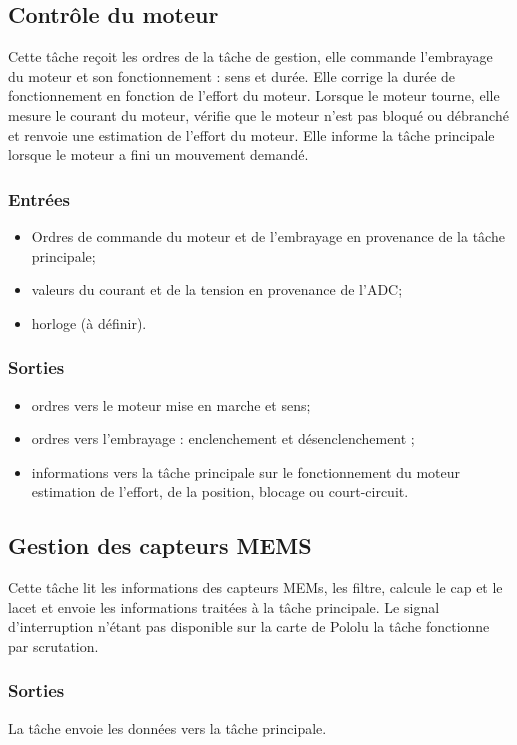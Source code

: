 \documentclass[a4paper,11pt]{report}
\begin{document}
\subsection{Contrôle du moteur}
Cette tâche reçoit les ordres de la tâche de gestion,
elle commande l'embrayage du moteur et son fonctionnement : sens et durée.
Elle corrige la durée de fonctionnement en fonction de l'effort du moteur.
Lorsque le moteur tourne, elle mesure le courant du moteur,
vérifie que le moteur n'est pas bloqué ou débranché et
renvoie une estimation de l'effort du moteur. Elle informe la tâche principale
lorsque le moteur a fini un mouvement demandé.
\subsubsection{Entrées}

\begin{itemize}
  \item Ordres de commande du moteur et de l'embrayage en provenance de la tâche principale;
  \item valeurs du courant et de la tension en provenance de l'ADC;
  \item horloge (à définir).
\end{itemize}
\subsubsection{Sorties}
\begin{itemize}
	\item ordres vers le moteur mise en marche et sens;
	\item ordres vers l'embrayage : enclenchement et désenclenchement ;
	\item informations vers la tâche principale sur le fonctionnement du moteur estimation de l'effort, de la position, blocage ou court-circuit.
\end{itemize}
\subsection{Gestion des capteurs MEMS}
Cette tâche lit les informations des capteurs MEMs, les filtre,
calcule le cap et le lacet et envoie les informations traitées à la tâche principale.
Le signal d'interruption n'étant pas disponible sur la carte de Pololu
la tâche fonctionne par scrutation.
\subsubsection{Sorties}
La tâche envoie les données vers la tâche principale.
\end{document}
